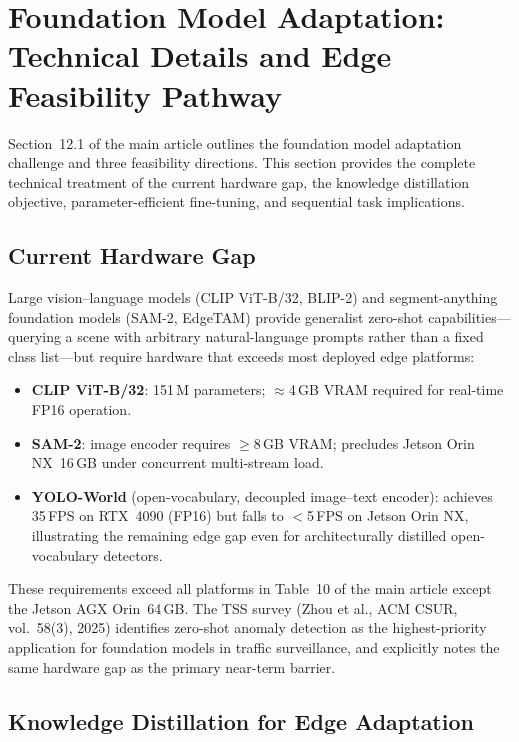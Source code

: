 \documentclass[11pt,a4paper]{article}
\begin{document}
\section{Foundation Model Adaptation: Technical Details and
         Edge Feasibility Pathway}
\label{sec:foundation_models_extended}

\noindent Section~12.1 of the main article outlines the foundation
model adaptation challenge and three feasibility directions.
This section provides the complete technical treatment of the
current hardware gap, the knowledge distillation objective,
parameter-efficient fine-tuning, and sequential task implications.

\subsection{Current Hardware Gap}

Large vision--language models (CLIP ViT-B/32, BLIP-2) and
segment-anything foundation models (SAM-2, EdgeTAM) provide
generalist zero-shot capabilities---querying a scene with arbitrary
natural-language prompts rather than a fixed class list---but require
hardware that exceeds most deployed edge platforms:

\begin{itemize}[leftmargin=*, noitemsep]
  \item \textbf{CLIP ViT-B/32}: 151\,M parameters;
    $\approx$4\,GB VRAM required for real-time FP16 operation.
  \item \textbf{SAM-2}: image encoder requires $\geq$8\,GB VRAM;
    precludes Jetson Orin NX~16\,GB under concurrent multi-stream load.
  \item \textbf{YOLO-World} (open-vocabulary, decoupled image--text
    encoder): achieves 35\,FPS on RTX~4090 (FP16) but falls to
    $<$5\,FPS on Jetson Orin NX, illustrating the remaining edge gap
    even for architecturally distilled open-vocabulary detectors.
\end{itemize}

These requirements exceed all platforms in Table~10 of the main
article except the Jetson AGX Orin~64\,GB. The TSS survey (Zhou et
al., ACM CSUR, vol.~58(3), 2025) identifies zero-shot anomaly
detection as the highest-priority application for foundation models
in traffic surveillance, and explicitly notes the same hardware
gap as the primary near-term barrier.

\subsection{Knowledge Distillation for Edge Adaptation}
\label{subsec:kd}
\end{document}
